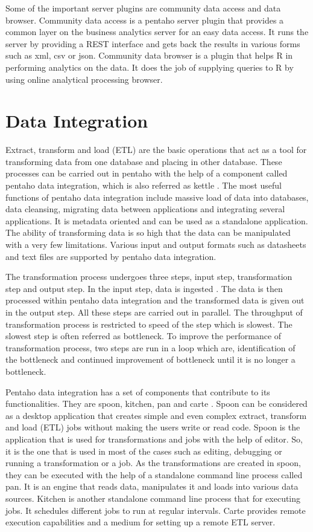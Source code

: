 \documentclass[9pt,twocolumn,twoside]{styles/osajnl}
\begin{document}
Some of the important server plugins are community data access and
data browser. Community data access is a pentaho server plugin that
provides a common layer on the business analytics server for an easy
data access. It runs the server by providing a REST interface and gets
back the results in various forms such as xml, csv or json. Community
data browser is a plugin that helps R in performing analytics on the
data. It does the job of supplying queries to R by using online
analytical processing browser.

\section{Data Integration}

Extract, transform and load (ETL) are the basic operations that act as
a tool for transforming data from one database and placing in other
database. These processes can be carried out in pentaho with the help
of a component called pentaho data integration, which is also referred
as kettle \cite{pent4}. The most useful functions of pentaho data
integration include massive load of data into databases, data
cleansing, migrating data between applications and integrating several
applications. It is metadata oriented and can be used as a standalone
application. The ability of transforming data is so high that the data
can be manipulated with a very few limitations. Various input and
output formats such as datasheets and text files are supported by
pentaho data integration.

The transformation process undergoes three steps, input step,
transformation step and output step. In the input step, data is
ingested \cite{pent5}. The data is then processed within pentaho data
integration and the transformed data is given out in the output
step. All these steps are carried out in parallel. The throughput of
transformation process is restricted to speed of the step which is
slowest. The slowest step is often referred as bottleneck. To improve
the performance of transformation process, two steps are run in a loop
which are, identification of the bottleneck and continued improvement
of bottleneck until it is no longer a bottleneck.

Pentaho data integration has a set of components that contribute to
its functionalities. They are spoon, kitchen, pan and carte
\cite{pent6}. Spoon can be considered as a desktop application that
creates simple and even complex extract, transform and load (ETL) jobs
without making the users write or read code. Spoon is the application
that is used for transformations and jobs with the help of editor. So,
it is the one that is used in most of the cases such as editing,
debugging or running a transformation or a job. As the transformations
are created in spoon, they can be executed with the help of a
standalone command line process called pan. It is an engine that reads
data, manipulates it and loads into various data sources. Kitchen is
another standalone command line process that for executing jobs. It
schedules different jobs to run at regular intervals. Carte provides
remote execution capabilities and a medium for setting up a remote ETL
server.
\end{document}
